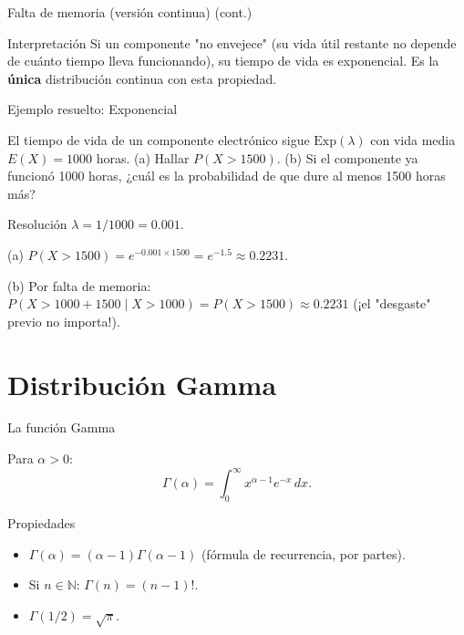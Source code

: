 \documentclass[aspectratio=169,11pt]{beamer}
\begin{document}
\begin{frame}{Falta de memoria (versión continua) (cont.)}
\begin{alertblock}{Interpretación}
Si un componente "no envejece" (su vida útil restante no depende de cuánto tiempo lleva funcionando), su tiempo de vida es exponencial. Es la \textbf{única} distribución continua con esta propiedad.
\end{alertblock}
\end{frame}

\begin{frame}{Ejemplo resuelto: Exponencial}
\begin{example}
El tiempo de vida de un componente electrónico sigue $\text{Exp}(\lambda)$ con vida media $E(X)=1000$ horas. (a) Hallar $P(X>1500)$. (b) Si el componente ya funcionó 1000 horas, ¿cuál es la probabilidad de que dure al menos 1500 horas más?
\end{example}

\begin{block}{Resolución}
$\lambda = 1/1000 = 0.001$.

(a) $P(X>1500) = e^{-0.001\times 1500} = e^{-1.5} \approx 0.2231$.

(b) Por falta de memoria: $P(X>1000+1500\mid X>1000) = P(X>1500) \approx 0.2231$ (¡el "desgaste" previo no importa!).
\end{block}
\end{frame}

\section{Distribución Gamma}

\begin{frame}{La función Gamma}
\begin{definition}
Para $\alpha>0$:
$$\Gamma(\alpha) = \int_0^\infty x^{\alpha-1}e^{-x}\,dx.$$
\end{definition}

\begin{block}{Propiedades}
\begin{itemize}
\item $\Gamma(\alpha) = (\alpha-1)\Gamma(\alpha-1)$ (fórmula de recurrencia, por partes).
\item Si $n\in\mathbb{N}$: $\Gamma(n) = (n-1)!$.
\item $\Gamma(1/2) = \sqrt{\pi}$.
\end{itemize}
\end{block}
\end{frame}
\end{document}
